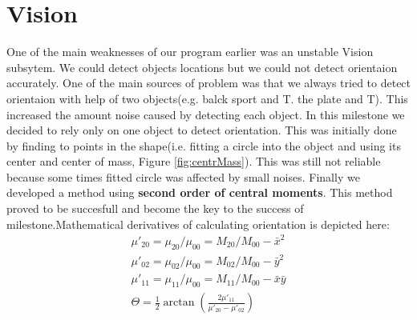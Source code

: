 \documentclass[conference,12pt]{IEEEtran}
\begin{document}
\section{Vision}
One of the main weaknesses of our program earlier was an unstable Vision subsytem. We could detect objects locations but we could not detect orientaion accurately. One of the main sources of problem was that we always tried to detect orientaion with help of two objects(e.g. balck sport and T. the plate and T). This increased the amount noise caused by detecting each object. 
In this milestone we decided to rely only on one object to detect orientation. This was initially done by finding to points in the shape(i.e. fitting a circle into the object and using its center and center of mass, Figure \ref{fig:centrMass}). This was still not reliable because some times fitted circle was affected by small noises.
Finally we developed a method using \textbf{second order of central moments}. This method proved to be succesfull and become the key to the success of milestone.Mathematical derivatives of calculating orientation is depicted here:
\begin{align}
\mu'_{20} = \mu_{20} / \mu_{00} = M_{20}/M_{00} - \bar{x}^2 \\
\mu'_{02} = \mu_{02} / \mu_{00} = M_{02}/M_{00} - \bar{y}^2 \\
\mu'_{11} = \mu_{11} / \mu_{00} = M_{11}/M_{00} - \bar{x}\bar{y} \\
\Theta = \frac{1}{2} \arctan \left( \frac{2\mu'_{11}}{\mu'_{20} - \mu'_{02}} \right)
\end{align}
\vspace{-2 mm}
\end{document}
